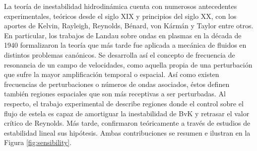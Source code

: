 \documentclass[12pt]{article}
\begin{document}
 La teoría de inestabilidad hidrodinámica cuenta con numerosos antecedentes experimentales, teóricos desde el siglo XIX y principios del siglo XX, con los aportes de Kelvin, Rayleigh, Reynolds, Bénard, von Kármán y Taylor entre otros. En particular, los trabajos de Landau\cite{landau1985} sobre ondas en plasmas en la década de 1940 formalizaron la teoría que más tarde fue aplicada a mecánica de fluidos en distintos problemas canónicos\cite{gaster1965role,mattingly1972stability,huerre1985absolute,trianta1986}. Se desarrolla así el concepto de frecuencia de resonancia de un campo de velocidades, como aquella propia de una perturbación que sufre la mayor amplificación temporal o espacial. Así como existen frecuencias de perturbaciones o números de ondas asociados, éstos definen también regiones espaciales que son más receptivas a ser perturbadas. Al respecto, el trabajo experimental de \citet{strykowski1990formation} describe regiones donde el control sobre el flujo de estela es capaz de amortiguar la inestabilidad de BvK y retrasar el valor crítico de Reynolds. Más tarde, \citet{Giannetti:2007p127} confirmaron teóricamente a través de estudios de estabilidad lineal sus hipótesis. Ambas contribuciones se resumen e ilustran en la Figura \ref{fig:sensibility}.
\end{document}
